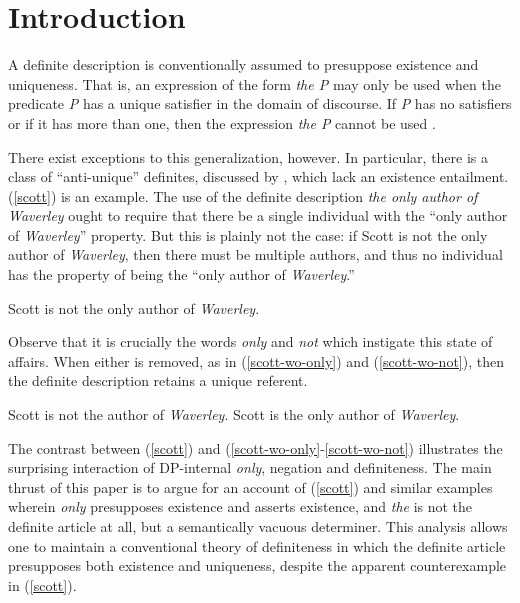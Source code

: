 \section{Introduction \label{sec:intro}}
A definite description is conventionally assumed to presuppose existence and uniqueness. That is, an expression of the form \textit{the P} may only be used when the predicate \textit{P} has a unique satisfier in the domain of discourse. If \textit{P} has no satisfiers or if it has more than one, then the expression \textit{the P} cannot be used \citep{frege, russell, horn-abbott-2012}.

There exist exceptions to this generalization, however. In particular, there is a class of ``anti-unique'' definites, discussed by \citet{cb2015}, which lack an existence entailment. (\ref{scott}) is an example. The use of the definite description \textit{the only author of Waverley} ought to require that there be a single individual with the ``only author of \textit{Waverley}'' property. But this is plainly not the case: if Scott is not the only author of \textit{Waverley}, then there must be multiple authors, and thus no individual has the property of being the ``only author of \textit{Waverley}.''

\begin{exe}
	\ex \label{scott} Scott is not the only author of \textit{Waverley}.
\end{exe}

Observe that it is crucially the words \textit{only} and \textit{not} which instigate this state of affairs. When either is removed, as in (\ref{scott-wo-only}) and (\ref{scott-wo-not}), then the definite description retains a unique referent.

\begin{exe}
	\ex \label{scott-wo-only} Scott is not the author of \textit{Waverley}.
	\ex \label{scott-wo-not} Scott is the only author of \textit{Waverley}.
\end{exe}

The contrast between (\ref{scott}) and (\ref{scott-wo-only}-\ref{scott-wo-not}) illustrates the surprising interaction of DP-internal \textit{only}, negation and definiteness. The main thrust of this paper is to argue for an account of (\ref{scott}) and similar examples wherein \textit{only} presupposes existence and asserts existence, and \textit{the} is not the definite article at all, but a semantically vacuous determiner. This analysis allows one to maintain a conventional theory of definiteness in which the definite article presupposes both existence and uniqueness, despite the apparent counterexample in (\ref{scott}).

